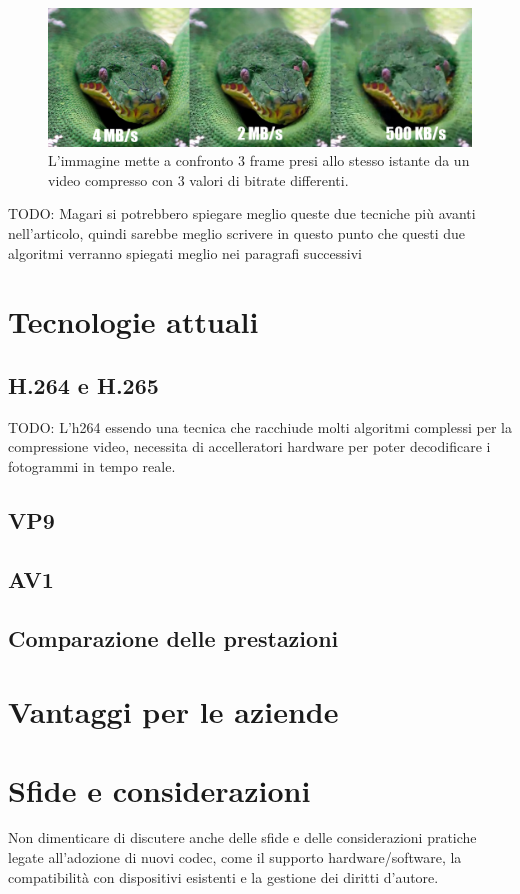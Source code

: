 \documentclass[a4paper,12pt, oneside]{article}
\begin{document}
\begin{figure}[ht]
    \centering
    \includegraphics[width=1\textwidth]{images/confronto-bitrate.png}
    \caption{L'immagine mette a confronto 3 frame presi allo stesso istante da un video compresso con 3 valori di bitrate differenti.}
    \label{fig:confronto_bitrate}
\end{figure}

TODO: Magari si potrebbero spiegare meglio queste due tecniche più avanti nell'articolo, quindi sarebbe meglio scrivere in questo
punto che questi due algoritmi verranno spiegati meglio nei paragrafi successivi

\section{Tecnologie attuali}
\subsection{H.264 e H.265}
TODO: L'h264 essendo una tecnica che racchiude molti algoritmi complessi per la compressione video, necessita di accelleratori hardware per poter decodificare i fotogrammi in tempo reale.

\subsection{VP9}    %
\subsection{AV1}
\subsection{Comparazione delle prestazioni}

\section{Vantaggi per le aziende}

\section{Sfide e considerazioni}
Non dimenticare di discutere anche delle sfide e delle considerazioni pratiche legate all'adozione di nuovi codec, come il supporto hardware/software, la compatibilità con dispositivi esistenti e la gestione dei diritti d'autore.
\end{document}
